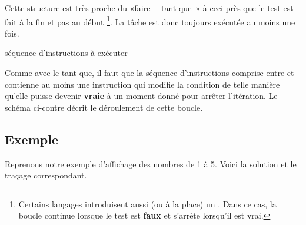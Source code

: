 	Cette structure est très proche du «faire~-~tant que~» 
	à ceci près que le test est fait à la fin et pas au début%
	\footnote{%
		Certains langages introduisent aussi (ou à la place)
		un .
		Dans ce cas, la boucle continue lorsque le test est
		\textbf{faux} et s'arrête lorsqu'il est vrai.
	}. 
	La tâche est donc toujours exécutée au moins une fois.

	\begin{LDA}
	\Repeat
		\Stmt séquence d’instructions à exécuter
	\end{LDA}

	Comme avec le tant-que, 
	il faut que la séquence d’instructions comprise entre
	 et  
	contienne au moins une instruction qui modifie la condition de
	telle manière qu’elle puisse devenir \textbf{vraie} à un moment donné
	pour arrêter l’itération. 
	Le schéma ci-contre décrit le déroulement de cette boucle. 

	\subsection{Exemple}

		Reprenons notre exemple d'affichage des nombres de 1 à 5.
		Voici la solution et le traçage correspondant.

